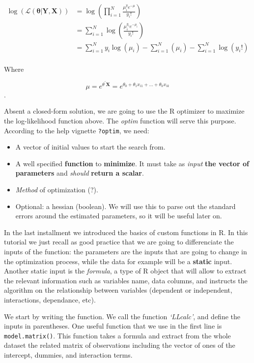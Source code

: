 \documentclass[]{book}
\begin{document}
\begin{equation}
\begin{aligned}
 \log( \mathcal{L}(\boldsymbol{\theta} | \boldsymbol{Y},\boldsymbol{X}))  &= \log \left( \prod_{i=1}^N \frac{\mu_i^y e^{-\mu}}{y_i!} \right) \\
 &= \sum_{i=1}^N \log \left( \frac{\mu_i^{y_i} e^{-\mu_i}}{y_i!} \right)\\
 &= \sum_{i=1}^N y_i \log \left( \mu_i \right) - \sum_{i=1}^N \left(\mu_i\right) -\sum_{i=1}^N \log \left(y_i! \right)\\
\end{aligned}
\end{equation}

Where

\[ \mu = e^{\theta^{\prime} \boldsymbol{X}}=e^{\theta_0 + \theta_1 x_{i1}+ ... + \theta_k x_{ik} }\].

Absent a closed-form solution, we are going to use the R optimizer to
maximize the log-likelihood function above. The \emph{optim} function
will serve this purpose. According to the help vignette \texttt{?optim},
we need:

\begin{itemize}
\item
  A vector of initial values to start the search from.
\item
  A well specified \textbf{function} to \textbf{minimize}. It must take
  as \emph{input} \textbf{the vector of parameters} and \emph{should}
  \textbf{return a scalar}.
\item
  \emph{Method} of optimization (?).
\item
  Optional: a hessian (boolean). We will use this to parse out the
  standard errors around the estimated parameters, so it will be useful
  later on.
\end{itemize}

In the last installment we introduced the basics of custom functions in
R. In this tutorial we just recall as good practice that we are going to
differenciate the inputs of the function: the parameters are the inputs
that are going to change in the optimization process, while the data for
example will be a \textbf{static} input. Another static input is the
\emph{formula}, a type of R object that will allow to extract the
relevant information such as variables name, data columns, and instructs
the algorithm on the relationship between variables (dependent or
independent, interactions, dependance, etc).

We start by writing the function. We call the function \emph{`LLcalc'},
and define the inputs in parentheses. One useful function that we use in
the first line is \texttt{model.matrix()}. This function takes a formula
and extract from the whole dataset the related matrix of observations
including the vector of ones of the intercept, dummies, and interaction
terms.
\end{document}
